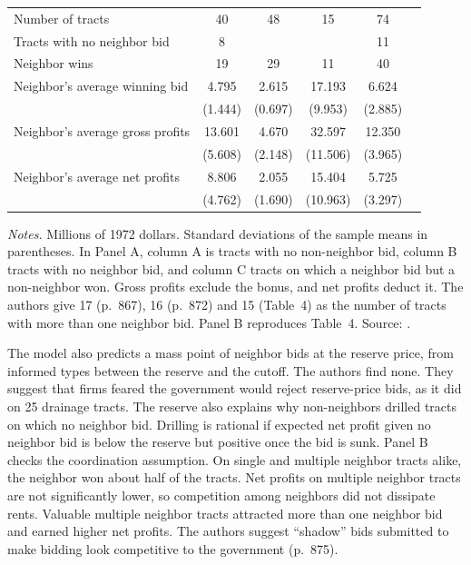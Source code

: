 \begin{table}[htbp]
\begin{tabular}{@{}lccccc@{}}
\midrule
Number of tracts & 40 & 48 & 15 & 74 & \\
Tracts with no neighbor bid & 8 & & & 11 & \\
Neighbor wins & 19 & 29 & 11 & 40 & \\
Neighbor's average winning bid & 4.795 & 2.615 & 17.193 & 6.624 & \\
 & (1.444) & (0.697) & (9.953) & (2.885) & \\
Neighbor's average gross profits & 13.601 & 4.670 & 32.597 & 12.350 & \\
 & (5.608) & (2.148) & (11.506) & (3.965) & \\
Neighbor's average net profits & 8.806 & 2.055 & 15.404 & 5.725 & \\
 & (4.762) & (1.690) & (10.963) & (3.297) & \\
\bottomrule
\end{tabular}

\smallskip
\begin{minipage}{0.92\textwidth}
\footnotesize \textit{Notes.} Millions of 1972 dollars. Standard deviations of the sample means in parentheses. In Panel
A, column A is tracts with no non-neighbor bid, column B tracts with no neighbor bid, and column C tracts on which
a neighbor bid but a non-neighbor won. Gross profits exclude the bonus, and net profits deduct it. The authors give 17
(p.~867), 16 (p.~872) and 15 (Table~4) as the number of tracts with more than one neighbor bid. Panel B reproduces
Table~4. Source: \citet[Tables~3 and~4]{HendricksPorter1988}.
\end{minipage}
\end{table}

The model also predicts a mass point of neighbor bids at the reserve price, from informed types between the
reserve and the cutoff. The authors find none. They suggest that firms feared the government would reject
reserve-price bids, as it did on 25 drainage tracts. The reserve also explains why non-neighbors drilled tracts
on which no neighbor bid. Drilling is rational if expected net profit given no neighbor bid is below the reserve
but positive once the bid is sunk. Panel B checks the coordination assumption. On single and multiple neighbor
tracts alike, the neighbor won about half of the tracts. Net profits on multiple neighbor tracts are not
significantly lower, so competition among neighbors did not dissipate rents. Valuable multiple neighbor tracts
attracted more than one neighbor bid and earned higher net profits. The authors suggest ``shadow'' bids
submitted to make bidding look competitive to the government (p.~875).

